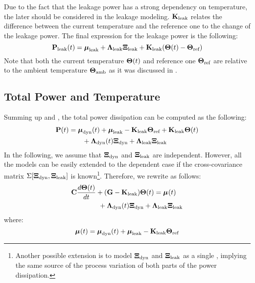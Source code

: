 Due to the fact that the leakage power has a strong dependency on temperature, the later should be considered in the leakage modeling. $\mathbf{K}_{\text{leak}}$ relates the difference between the current temperature and the reference one to the change of the leakage power. The final expression for the leakage power is the following:
\begin{equation} \equlabel{leakage-power}
  \vpower_\leak(\time) = \vmean{\leak} + \ddev{\leak} \vnormal_\leak + \mratio_\leak(\vtemp(\time) - \vtemp_\refer)
\end{equation}
Note that both the current temperature $\mathbf{\Theta}(t)$ and reference one $\mathbf{\Theta}_{\text{ref}}$ are relative to the ambient temperature $\mathbf{\Theta}_{\text{amb}}$ as it was discussed in .

\subsection{Total Power and Temperature}
Summing up  and , the total power dissipation can be computed as the following:
\begin{align} \equlabel{total-power}
  \vpower(\time) & = \vmean{\dyn}(\time) + \vmean{\leak} - \mratio_\leak \vtemp_\refer + \mratio_\leak \vtemp(\time) \nonumber \\
  & { } \qquad + \ddev{\dyn}(\time) \vnormal_\dyn + \ddev{\leak} \vnormal_\leak
\end{align}
In the following, we assume that $\mathbf{\Xi}_{\text{dyn}}$ and $\mathbf{\Xi}_{\text{leak}}$ are independent. However, all the models can be easily extended to the dependent case if the cross-covariance matrix $\Sigma[\mathbf{\Xi}_{\text{dyn}}, \mathbf{\Xi}_{\text{leak}}]$ is known\footnote{Another possible extension is to model $\mathbf{\Xi}_{\text{dyn}}$ and $\mathbf{\Xi}_{\text{leak}}$ as a single \mrv, implying the same source of the process variation of both parts of the power dissipation.}. Therefore, we rewrite  as follows:
\begin{align}
  & \mcapacitance \frac{d\vtemp(\time)}{d\time} + (\mconductance - \mratio_\leak) \vtemp(\time) = \vmean{}(\time) \nonumber \\
  & { } \qquad \qquad + \ddev{\dyn}(\time) \vnormal_\dyn + \ddev{\leak} \vnormal_\leak  \equlabel{fourier-pv}
\end{align}
where:
\[
  \boldsymbol\mu_{}(t) = \boldsymbol\mu_{\text{dyn}}(t) + \boldsymbol\mu_{\text{leak}} - \mathbf{K}_{\text{leak}} \mathbf{\Theta}_{\text{ref}}
\]
